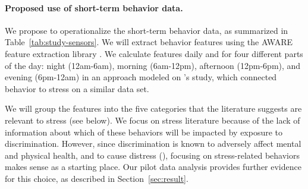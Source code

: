 \paragraph{Proposed use of short-term behavior data.} We propose to operationalize the short-term behavior data, as summarized in Table~\ref{tab:study-sensors}.  We will extract behavior features using  the AWARE feature extraction library \citep{Chikersal:2019}. We calculate features daily and for four different parts of the day: night (12am-6am), morning (6am-12pm), afternoon (12pm-6pm), and evening (6pm-12am) in an approach modeled on \citep{wang2014studentlife}'s study, which connected behavior to stress on a similar data set. 

We will group the features into the five categories that the literature suggests are relevant to stress (see below).  We focus on stress literature because of the lack of information about which of these behaviors will be impacted by  exposure to discrimination. However, since discrimination is known to  adversely affect mental and physical health, and to cause distress (\eg \cite{Ong:2009}), focusing on stress-related behaviors makes sense as a starting place. Our pilot data analysis provides further evidence for this choice, as described in Section~\ref{sec:result}.

